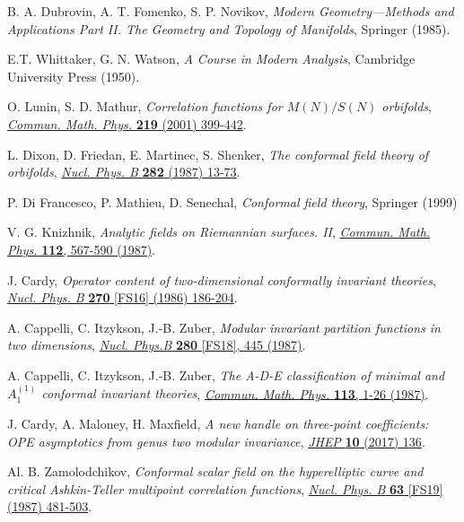 \documentclass[a4paper,11pt]{article}
\begin{document}
\begin{thebibliography}{99}

 B. A. Dubrovin, A. T. Fomenko, S. P. Novikov, \textit{Modern Geometry---Methods and Applications Part II. The Geometry and Topology of Manifolds}, Springer (1985).

 E.T. Whittaker, G. N. Watson, \emph{A Course in Modern Analysis}, Cambridge University Press (1950).

 O. Lunin, S. D. Mathur, \emph{Correlation functions for $M(N)/S(N)$ orbifolds}, \href{https://doi.org/10.1007/s002200100431}{\emph{Commun. Math. Phys.} {\bf 219} (2001) 399-442}.

 L. Dixon, D. Friedan, E. Martinec, S. Shenker, \textit{The conformal field theory of orbifolds}, 
\href{https://doi.org/10.1016/0550-3213(87)90676-6}{\emph{Nucl. Phys. B} {\bf 282} (1987) 13-73}.

 P. Di Francesco, P. Mathieu, D. Senechal, \textit{Conformal field theory}, Springer (1999)

 V. G. Knizhnik, \emph{Analytic fields on Riemannian surfaces. II}, 
\href{https://doi.org/10.1007/BF01225373}{\emph{Commun. Math. Phys.} {\bf 112}, 567-590 (1987)}.

 J. Cardy, \emph{Operator content of two-dimensional conformally invariant theories}, 
\href{https://doi.org/10.1016/0550-3213(86)90552-3}{\emph{Nucl. Phys. B} {\bf 270} [FS16] (1986) 186-204}.

 A. Cappelli, C. Itzykson, J.-B. Zuber, \emph{Modular invariant partition functions in two dimensions}, 
\href{https://doi.org/10.1016/0550-3213(87)90155-6}{\emph{Nucl. Phys.B} {\bf 280} [FS18], 445 (1987)}.

 A. Cappelli, C. Itzykson, J.-B. Zuber, \emph{The A-D-E classification of minimal and $A_1^{(1)}$ conformal invariant theories}, \href{https://doi.org/10.1007/BF01221394}{\emph{Commun. Math. Phys.} {\bf 113}, 1-26 (1987)}.

 J. Cardy, A. Maloney, H. Maxfield, \emph{A new handle on three-point coefficients: OPE asymptotics from genus
two modular invariance}, \href{https://doi.org/10.1007/JHEP10(2017)136}{\emph{JHEP} {\bf 10} (2017) 136}.

 Al. B. Zamolodchikov, \emph{Conformal scalar field on the hyperelliptic curve and critical Ashkin-Teller multipoint correlation functions}, \href{https://doi.org/10.1016/0550-3213(87)90350-6}{\emph{Nucl. Phys. B} {\bf 63} [FS19] (1987) 481-503}.


\end{thebibliography}
\end{document}
